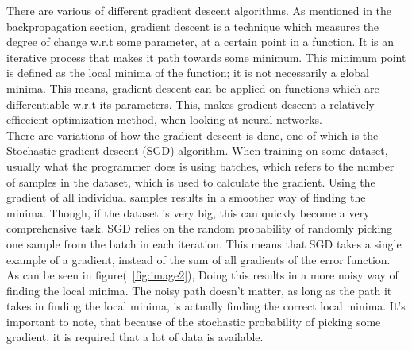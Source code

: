 There are various of different gradient descent algorithms. As mentioned in the backpropagation section, gradient descent is a technique which measures the degree of change w.r.t some parameter, at a certain point in a function. It is an iterative process that makes it path towards some minimum. This minimum point is defined as the local minima of the function; it is not necessarily a global minima. This means, gradient descent can be applied on functions which are differentiable w.r.t its parameters. This, makes gradient descent a relatively effiecient optimization method, when looking at neural networks.\\

\noindent
There are variations of how the gradient descent is done, one of which is the Stochastic gradient descent (SGD) algorithm. When training on some dataset, usually what the programmer does is using batches, which refers to the number of samples in the dataset, which is used to calculate the gradient. Using the gradient of all individual samples results in a smoother way of finding the minima. Though, if the dataset is very big, this can quickly become a very comprehensive task. SGD relies on the random probability of randomly picking one sample from the batch in each iteration. This means that SGD takes a single example of a gradient, instead of the sum of all gradients of the error function. As can be seen in figure(~\ref{fig:image2}), Doing this results in a more noisy way of finding the local minima. The noisy path doesn't matter, as long as the path it takes in finding the local minima, is actually finding the correct local minima. It's important to note, that because of the stochastic probability of picking some gradient, it is required that a lot of data is available.

